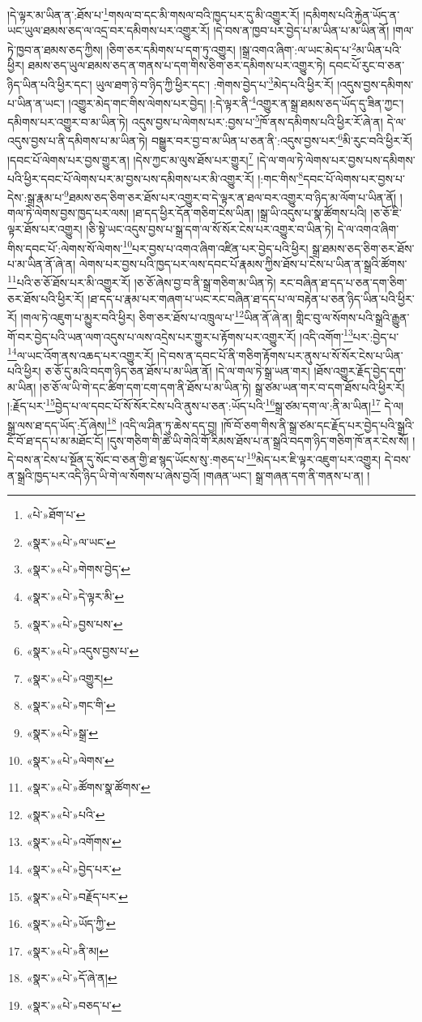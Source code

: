 །དེ་ལྟར་མ་ཡིན་ན་:ཐོས་པ་\footnote{«པེ་»ཐོག་པ་}གསལ་བ་དང་མི་གསལ་བའི་ཁྱད་པར་དུ་མི་འགྱུར་རོ། །དམིགས་པའི་རྐྱེན་ཡོད་ན་ཡང་ཡུལ་ཐམས་ཅད་ལ་འདྲ་བར་དམིགས་པར་འགྱུར་རོ། །དེ་བས་ན་ཁྱབ་པར་བྱེད་པ་མ་ཡིན་པ་མ་ཡིན་ནོ། །གལ་ཏེ་ཁྱབ་ན་ཐམས་ཅད་ཀྱིས། །ཅིག་ཅར་དམིགས་པ་དག་ཏུ་འགྱུར། །སྒྲ་འགའ་ཞིག་:ལ་ཡང་མེད་པ་\footnote{«སྣར་»«པེ་»ལ་ཡང་}མ་ཡིན་པའི་ཕྱིར། ཐམས་ཅད་ཡུལ་ཐམས་ཅད་ན་གནས་པ་དག་གིས་ཅིག་ཅར་དམིགས་པར་འགྱུར་ཏེ། དབང་པོ་རུང་བ་ཅན་ཉིད་ཡིན་པའི་ཕྱིར་དང་། ཡུལ་ཐག་ཉེ་བ་ཉིད་ཀྱི་ཕྱིར་དང་། :གེགས་བྱེད་པ་\footnote{«སྣར་»«པེ་»གེགས་བྱེད་}མེད་པའི་ཕྱིར་རོ། །འདུས་བྱས་དམིགས་པ་ཡིན་ན་ཡང་། །འགྱུར་མེད་གང་གིས་ལེགས་པར་བྱེད། །:དེ་ལྟར་ནི་\footnote{«སྣར་»«པེ་»དེ་ལྟར་མི་}འགྱུར་ན་སྒྲ་ཐམས་ཅད་ཡོད་དུ་ཟིན་ཀྱང་། དམིགས་པར་འགྱུར་བ་མ་ཡིན་ཏེ། འདུས་བྱས་པ་ལེགས་པར་:བྱས་པ་\footnote{«སྣར་»«པེ་»བྱས་པས་}ཁོ་ནས་དམིགས་པའི་ཕྱིར་རོ་ཞེ་ན། དེ་ལ་འདུས་བྱས་པ་ནི་དམིགས་པ་མ་ཡིན་ཏེ། བསྒྱུར་བར་བྱ་བ་མ་ཡིན་པ་ཅན་ནི་:འདུས་བྱས་པར་\footnote{«སྣར་»«པེ་»འདུས་བྱས་པ་}མི་རུང་བའི་ཕྱིར་རོ། །དབང་པོ་ལེགས་པར་བྱས་གྱུར་ན། །དེས་ཀྱང་མ་ལུས་ཐོས་པར་གྱུར།\footnote{«སྣར་»«པེ་»འགྱུར།} །དེ་ལ་གལ་ཏེ་ལེགས་པར་བྱས་པས་དམིགས་པའི་ཕྱིར་དབང་པོ་ལེགས་པར་མ་བྱས་པས་དམིགས་པར་མི་འགྱུར་རོ། །:གང་གིས་\footnote{«སྣར་»«པེ་»གང་གི་}དབང་པོ་ལེགས་པར་བྱས་པ་དེས་:སྒྲ་རྣམ་པ་\footnote{«སྣར་»«པེ་»སྒྲ་}ཐམས་ཅད་ཅིག་ཅར་ཐོས་པར་འགྱུར་བ་དེ་ལྟར་ན་ཐལ་བར་འགྱུར་བ་ཉིད་མ་ལོག་པ་ཡིན་ནོ། །གལ་ཏེ་ལེགས་བྱས་ཁྱད་པར་ལས། །ཐ་དད་ཕྱིར་དོན་གཅིག་ངེས་ཡིན། །སྒྲ་ཡི་འདུས་པ་སྣ་ཚོགས་པའི། །ཅ་ཅོ་ཇི་ལྟར་ཐོས་པར་འགྱུར། །ཅི་སྟེ་ཡང་འདུས་བྱས་པ་སྒྲ་དག་ལ་སོ་སོར་ངེས་པར་འགྱུར་བ་ཡིན་ཏེ། དེ་ལ་འགའ་ཞིག་གིས་དབང་པོ་:ལེགས་སོ་ལེགས་\footnote{«སྣར་»«པེ་»ལེགས་}པར་བྱས་པ་འགའ་ཞིག་འཛིན་པར་བྱེད་པའི་ཕྱིར། སྒྲ་ཐམས་ཅད་ཅིག་ཅར་ཐོས་པ་མ་ཡིན་ནོ་ཞེ་ན། ལེགས་པར་བྱས་པའི་ཁྱད་པར་ལས་དབང་པོ་རྣམས་ཀྱིས་ཐོས་པ་ངེས་པ་ཡིན་ན་སྒྲའི་ཚོགས་\footnote{«སྣར་»«པེ་»ཚོགས་སྣ་ཚོགས་}པའི་ཅ་ཅོ་ཐོས་པར་མི་འགྱུར་རོ། །ཅ་ཅོ་ཞེས་བྱ་བ་ནི་སྒྲ་གཅིག་མ་ཡིན་ཏེ། རང་བཞིན་ཐ་དད་པ་ཅན་དག་ཅིག་ཅར་ཐོས་པའི་ཕྱིར་རོ། །ཐ་དད་པ་རྣམ་པར་གཞག་པ་ཡང་རང་བཞིན་ཐ་དད་པ་ལ་བརྟེན་པ་ཅན་ཉིད་ཡིན་པའི་ཕྱིར་རོ། །གལ་ཏེ་འཇུག་པ་མྱུར་བའི་ཕྱིར། ཅིག་ཅར་ཐོས་པ་འཁྲུལ་པ་\footnote{«སྣར་»«པེ་»པའི་}ཡིན་ནོ་ཞེ་ན། གླིང་བུ་ལ་སོགས་པའི་སྒྲའི་རྒྱུན་གོ་བར་བྱེད་པའི་ཡན་ལག་འདུས་པ་ལས་འདྲེས་པར་གྱུར་པ་རྟོགས་པར་འགྱུར་རོ། །འདི་འགོག་\footnote{«སྣར་»«པེ་»འགོགས་}པར་:བྱེད་པ་\footnote{«སྣར་»«པེ་»བྱེད་པར་}ལ་ཡང་འོག་ནས་འཆད་པར་འགྱུར་རོ། །དེ་བས་ན་དབང་པོ་ནི་གཅིག་རྟོགས་པར་ནུས་པ་སོ་སོར་ངེས་པ་ཡིན་པའི་ཕྱིར། ཅ་ཅོ་དུ་མའི་བདག་ཉིད་ཅན་ཐོས་པ་མ་ཡིན་ནོ། །དེ་ལ་གལ་ཏེ་སྒྲ་ཡན་གར། །ཐོས་འགྱུར་རྗོད་བྱེད་དག་མ་ཡིན། །ཅ་ཅོ་ལ་ཡི་གེ་དང་ཚིག་དག་ངག་དག་ནི་ཐོས་པ་མ་ཡིན་ཏེ། སྒྲ་ཙམ་ཡན་གར་བ་དག་ཐོས་པའི་ཕྱིར་རོ། །:རྗོད་པར་\footnote{«སྣར་»«པེ་»བརྗོད་པར་}བྱེད་པ་ལ་དབང་པོ་སོ་སོར་ངེས་པའི་ནུས་པ་ཅན་:ཡོད་པའི་\footnote{«སྣར་»«པེ་»ཡོད་ཀྱི་}སྒྲ་ཙམ་དག་ལ་:ནི་མ་ཡིན།\footnote{«སྣར་»«པེ་»ནི་མ།} དེ་ལ། སྒྲ་ལས་ཐ་དད་ཡོད་:དོ་ཞེས།\footnote{«སྣར་»«པེ་»དོ་ཞེ་ན།} །འདི་ལ་ཤིན་ཏུ་ཆེས་དད་བྱ། །ཁོ་བོ་ཅག་གིས་ནི་སྒྲ་ཙམ་དང་རྗོད་པར་བྱེད་པའི་སྒྲའི་ངོ་བོ་ཐ་དད་པ་མ་མཐོང་ངོ། །དུས་གཅིག་གི་ཚེ་ཡི་གེའི་གོ་རིམས་ཐོས་པ་ན་སྒྲའི་བདག་ཉིད་གཅིག་ཁོ་ནར་ངེས་སོ། །དེ་བས་ན་ངེས་པ་སྔོན་དུ་སོང་བ་ཅན་གྱི་ཐ་སྙད་ཡོངས་སུ་:གཅད་པ་\footnote{«སྣར་»«པེ་»བཅད་པ་}མེད་པར་ཇི་ལྟར་འཇུག་པར་འགྱུར། དེ་བས་ན་སྒྲའི་ཁྱད་པར་འདི་ཉིད་ཡི་གེ་ལ་སོགས་པ་ཞེས་བྱའོ། །གཞན་ཡང་། སྒྲ་གཞན་དག་ནི་གནས་པ་ན། །
